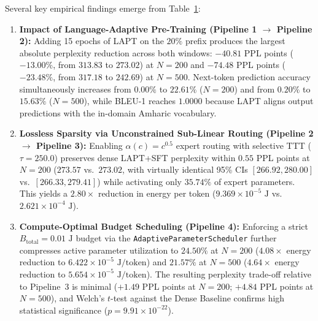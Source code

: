 \documentclass{interact}
\begin{document}
\begin{table}[htbp]
{{\begin{tabular}{@{}llcccccc@{}}
                \bottomrule
            \end{tabular}}}
    \label{tab:results}
\end{table}

Several key empirical findings emerge from Table~\ref{tab:results}:
\begin{enumerate}
    \item \textbf{Impact of Language-Adaptive Pre-Training (Pipeline 1 $\to$ Pipeline 2):} Adding 15 epochs of LAPT on the $20\%$ prefix produces the largest absolute perplexity reduction across both windows: $-40.81$ PPL points ($-13.00\%$, from $313.83$ to $273.02$) at $N=200$ and $-74.48$ PPL points ($-23.48\%$, from $317.18$ to $242.69$) at $N=500$. Next-token prediction accuracy simultaneously increases from $0.00\%$ to $22.61\%$ ($N=200$) and from $0.20\%$ to $15.63\%$ ($N=500$), while BLEU-1 reaches $1.0000$ because LAPT aligns output predictions with the in-domain Amharic vocabulary.
    \item \textbf{Lossless Sparsity via Unconstrained Sub-Linear Routing (Pipeline 2 $\to$ Pipeline 3):} Enabling $\alpha(c) = c^{0.5}$ expert routing with selective TTT ($\tau = 250.0$) preserves dense LAPT+SFT perplexity within $0.55$ PPL points at $N=200$ ($273.57$ vs.\ $273.02$, with virtually identical 95\% CIs $[266.92, 280.00]$ vs.\ $[266.33, 279.41]$) while activating only $35.74\%$ of expert parameters. This yields a $2.80\times$ reduction in energy per token ($9.369 \times 10^{-5}\text{ J}$ vs.\ $2.621 \times 10^{-4}\text{ J}$).
    \item \textbf{Compute-Optimal Budget Scheduling (Pipeline 4):} Enforcing a strict $B_{\text{total}} = 0.01\text{ J}$ budget via the \texttt{AdaptiveParameterScheduler} further compresses active parameter utilization to $24.50\%$ at $N=200$ ($4.08\times$ energy reduction to $6.422 \times 10^{-5}\text{ J/token}$) and $21.57\%$ at $N=500$ ($4.64\times$ energy reduction to $5.654 \times 10^{-5}\text{ J/token}$). The resulting perplexity trade-off relative to Pipeline~3 is minimal ($+1.49$ PPL points at $N=200$; $+4.84$ PPL points at $N=500$), and Welch's $t$-test against the Dense Baseline confirms high statistical significance ($p = 9.91 \times 10^{-22}$).
\end{enumerate}
\end{document}
